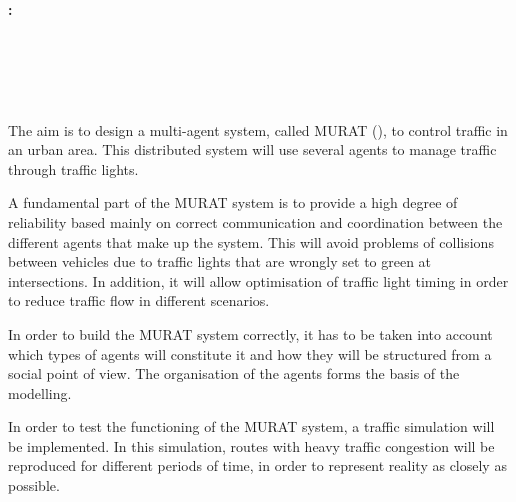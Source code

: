 \cleardoublepage

\chapter*{}

\thispagestyle{empty}

\begin{center}
    {\large\bfseries \myTitleShort: \myTitle}\\
\end{center}

\begin{center}
    \myName\\
\end{center}

\\

    \vspace{0.7cm}

\\

The aim is to design a multi-agent system, called MURAT (\myTitle), to control traffic in an urban area. This distributed system will use several agents to manage traffic through traffic lights.

A fundamental part of the MURAT system is to provide a high degree of reliability based mainly on correct communication and coordination between the different agents that make up the system. This will avoid problems of collisions between vehicles due to traffic lights that are wrongly set to green at intersections. In addition, it will allow optimisation of traffic light timing in order to reduce traffic flow in different scenarios. 

In order to build the MURAT system correctly, it has to be taken into account which types of agents will constitute it and how they will be structured from a social point of view. The organisation of the agents forms the basis of the modelling.

In order to test the functioning of the MURAT system, a traffic simulation will be implemented. In this simulation, routes with heavy traffic congestion will be reproduced for different periods of time, in order to represent reality as closely as possible.
